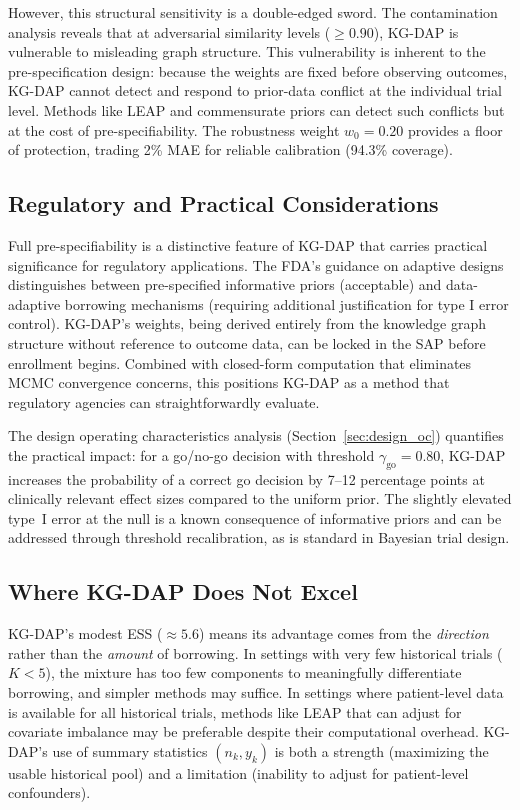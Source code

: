 \documentclass[12pt]{article}
\begin{document}
However, this structural sensitivity is a double-edged sword. The contamination analysis reveals that at adversarial similarity levels ($\geq 0.90$), KG-DAP is vulnerable to misleading graph structure. This vulnerability is inherent to the pre-specification design: because the weights are fixed before observing outcomes, KG-DAP cannot detect and respond to prior-data conflict at the individual trial level. Methods like LEAP \citep{alt2024leap} and commensurate priors \citep{hobbs2011hierarchical} can detect such conflicts but at the cost of pre-specifiability. The robustness weight $w_0 = 0.20$ provides a floor of protection, trading 2\% MAE for reliable calibration (94.3\% coverage).

\subsection{Regulatory and Practical Considerations}

Full pre-specifiability is a distinctive feature of KG-DAP that carries practical significance for regulatory applications. The FDA's guidance on adaptive designs \citep{fda2019adaptive} distinguishes between pre-specified informative priors (acceptable) and data-adaptive borrowing mechanisms (requiring additional justification for type I error control). KG-DAP's weights, being derived entirely from the knowledge graph structure without reference to outcome data, can be locked in the SAP before enrollment begins. Combined with closed-form computation that eliminates MCMC convergence concerns, this positions KG-DAP as a method that regulatory agencies can straightforwardly evaluate.

The design operating characteristics analysis (Section~\ref{sec:design_oc}) quantifies the practical impact: for a go/no-go decision with threshold $\gamma_{\mathrm{go}} = 0.80$, KG-DAP increases the probability of a correct go decision by 7--12 percentage points at clinically relevant effect sizes compared to the uniform prior. The slightly elevated type~I error at the null is a known consequence of informative priors and can be addressed through threshold recalibration, as is standard in Bayesian trial design.

\subsection{Where KG-DAP Does Not Excel}

KG-DAP's modest ESS ($\approx 5.6$) means its advantage comes from the \emph{direction} rather than the \emph{amount} of borrowing. In settings with very few historical trials ($K < 5$), the mixture has too few components to meaningfully differentiate borrowing, and simpler methods may suffice. In settings where patient-level data is available for all historical trials, methods like LEAP that can adjust for covariate imbalance may be preferable despite their computational overhead. KG-DAP's use of summary statistics $(n_k, y_k)$ is both a strength (maximizing the usable historical pool) and a limitation (inability to adjust for patient-level confounders).
\end{document}
